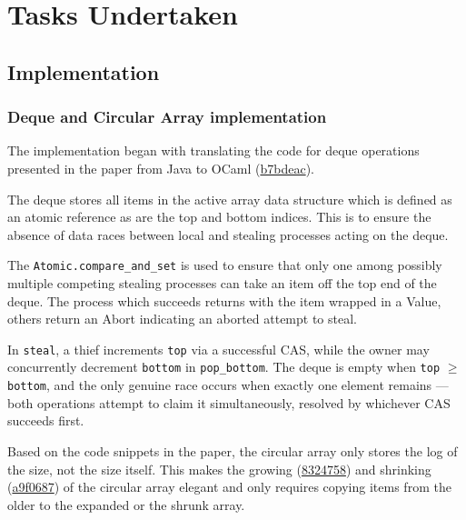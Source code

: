 \documentclass[11pt,a4paper]{article}
\begin{document}
\section{Tasks Undertaken}
\label{sec:tasks}

\subsection{Implementation}

\subsubsection{Deque and Circular Array implementation}

The implementation began with translating the code for deque operations
presented in the \cite{chase2005dynamic} paper from Java to OCaml
(\href{https://github.com/alinab/fork-cs6868_s26/commit/b7bdeac9167f5fbeaee63e81deceaf0c43733d98}{b7bdeac}).

The deque stores all items in the active array data structure which is defined
as an atomic reference as are the top and bottom indices. This is to ensure the
absence of data races between local and stealing processes acting on the deque.

The \texttt{Atomic.compare\_and\_set} is used to ensure that only one among
possibly multiple competing stealing processes can take an item off the top
end of the deque. The process which succeeds returns with the item wrapped in a
Value, others return an Abort indicating an aborted attempt to steal.

In \texttt{steal}, a thief increments \texttt{top} via a successful CAS,
while the owner may concurrently decrement \texttt{bottom} in
\texttt{pop\_bottom}. The deque is empty when \texttt{top} $\geq$
\texttt{bottom}, and the only genuine race occurs when exactly one element
remains — both operations attempt to claim it simultaneously, resolved by
whichever CAS succeeds first.

Based on the code snippets in the \cite{chase2005dynamic} paper, the circular
array only stores the log of the size, not the size itself. This makes the growing
(\href{https://github.com/alinab/fork-cs6868_s26/commit/8324758fc3e51c064bcb5e6a216e97d5cc356c15}{8324758})
and shrinking
(\href{https://github.com/alinab/fork-cs6868_s26/commit/a9f0687fc8eb0b61dc2f059683f209be6a223649}{a9f0687})
of the circular array elegant and only requires copying items from the older to
the expanded or the shrunk array.
\end{document}

